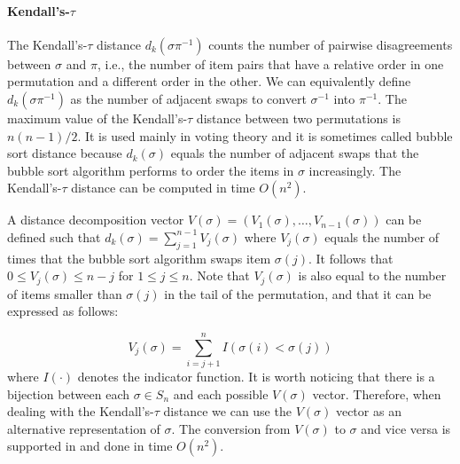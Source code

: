 \documentclass[article,nojss]{jss}
\begin{document}
\paragraph{Kendall's-$\tau$}
The Kendall's-$\tau$ distance $d_k(\sigma \pi^{-1})$ counts the number of pairwise disagreements between $\sigma$ and $\pi$, i.e., the number of item pairs that have a relative order in one permutation and a different order in the other. We can equivalently define $d_k(\sigma\pi^{-1})$ as the number of adjacent swaps to convert $\sigma^{-1}$ into $\pi^{-1}$. The maximum value of the Kendall's-$\tau$ distance between two permutations is $n(n-1)/2$. It is used mainly in voting theory and it is sometimes called bubble sort distance because $d_k(\sigma)$ equals the number of adjacent swaps that the bubble sort algorithm performs to order the items in $\sigma$ increasingly. The Kendall's-$\tau$ distance can be computed in time $O(n^2)$.

A distance decomposition vector $V(\sigma)=(V_1(\sigma), \ldots, V_{n-1}(\sigma))$ can be defined such that $d_k(\sigma) = \sum_{j=1}^{n-1} V_j(\sigma)$ where $V_j(\sigma)$ equals the number of times that the bubble sort algorithm swaps item $\sigma(j)$. It follows that $0\leq V_j(\sigma) \leq n-j$ for $1\leq j \leq n$. Note that $V_j(\sigma)$ is also equal to the number of items smaller than $\sigma(j)$ in the tail of the permutation, and that it can be expressed as follows:

\begin{equation}
 V_j(\sigma) = \sum_{i=j+1}^n I(\sigma(i) < \sigma(j))	
 \label{eq:kendall_decomp}
\end{equation}
where $I(\cdot)$ denotes the indicator function. It is worth noticing that there is a bijection between each $\sigma \in S_n$ and each possible $V(\sigma)$ vector. Therefore, when dealing with the Kendall's-$\tau$ distance we can use the $V(\sigma)$ vector as an alternative representation of $\sigma$. The conversion from $V(\sigma)$ to $\sigma$ and vice versa is supported in  and done in time $O(n^2)$.
\end{document}

